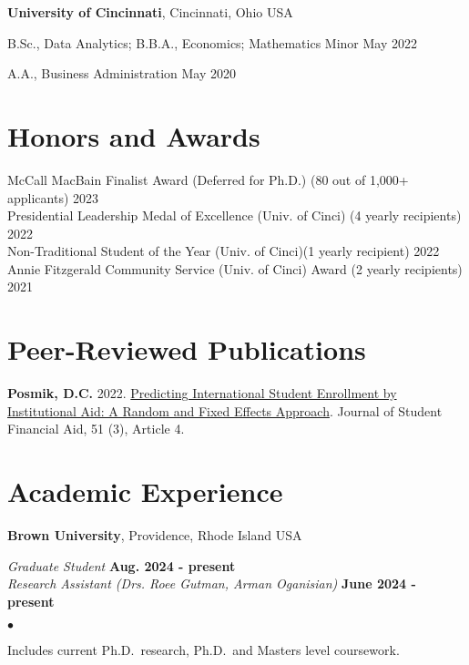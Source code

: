 \documentclass[margin,line]{res}
\newenvironment{list1}{
  \begin{list}{\ding{113}}{%
      \setlength{\itemsep}{0in}
      \setlength{\parsep}{0in} \setlength{\parskip}{0in}
      \setlength{\topsep}{0in} \setlength{\partopsep}{0in} 
      \setlength{\leftmargin}{0.17in}}}{\end{list}}
\newenvironment{list2}{
  \begin{list}{$\bullet$}{%
      \setlength{\itemsep}{0in}
      \setlength{\parsep}{0in} \setlength{\parskip}{0in}
      \setlength{\topsep}{0in} \setlength{\partopsep}{0in} 
      \setlength{\leftmargin}{0.2in}}}{\end{list}}
\begin{document}
\begin{resume}
{\bf University of Cincinnati}, Cincinnati, Ohio USA\\
\vspace*{-.15in}
\begin{list1}
\item[] B.Sc., Data Analytics; B.B.A., Economics; Mathematics Minor \hfill May 2022
\item[] A.A., Business Administration \hfill May 2020
\end{list1}


\section{\sc Honors and Awards} 
McCall MacBain Finalist Award (Deferred for Ph.D.) (80 out of 1,000+ applicants) \hfill 2023 \\  
Presidential Leadership Medal of Excellence (Univ. of Cinci) (4 yearly recipients) \hfill 2022 \\ 
Non-Traditional Student of the Year (Univ. of Cinci)(1 yearly recipient) \hfill 2022 \\
Annie Fitzgerald Community Service (Univ. of Cinci) Award (2 yearly recipients) \hfill 2021


\section{\sc Peer-Reviewed Publications}
{\bf Posmik, D.C.} 2022. \href{https://ir.library.louisville.edu/jsfa/vol51/iss3/4/}{Predicting International Student Enrollment by Institutional Aid: A Random and Fixed Effects Approach}. Journal of Student Financial Aid, 51 (3), Article 4.  


\section{\sc Academic Experience}
{\bf Brown University}, Providence, Rhode Island USA

\vspace{-.3cm}
{\em Graduate Student} \hfill {\bf Aug. 2024 - present}\\
{\em Research Assistant (Drs. Roee Gutman, Arman Oganisian)} \hfill {\bf June 2024 - present}\\

\begin{list2}
\item Includes current Ph.D.~research, Ph.D.~and Masters level coursework. 
\end{list2}


\end{resume}
\end{document}
